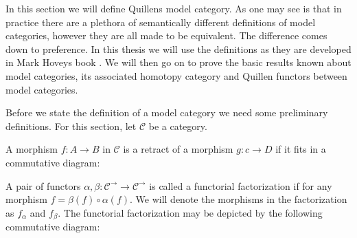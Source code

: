 \documentclass[../thesis.tex]{subfiles}
\begin{document}
        In this section we will define Quillens model category. As one may see is that in practice there are a plethora of semantically different definitions of model categories, however they are all made to be equivalent. The difference comes down to preference. In this thesis we will use the definitions as they are developed in Mark Hoveys book \cite{Hovey99}. We will then go on to prove the basic results known about model categories, its associated homotopy category and Quillen functors between model categories.

        Before we state the definition of a model category we need some preliminary definitions. For this section, let $\mathcal{C}$ be a category.

        \begin{definition}[Retract]
            A morphism $f:A\rightarrow B$ in $\mathcal{C}$ is a retract of a morphism $g: c\rightarrow D$ if it fits in a commutative diagram:
            \begin{center}
            \end{center}
        \end{definition}

        \begin{definition}
            A pair of functors $\alpha, \beta: \mathcal{C}^\rightarrow\rightarrow\mathcal{C}^\rightarrow$ is called a functorial factorization if for any morphism $f = \beta(f)\circ\alpha(f)$. We will denote the morphisms in the factorization as $f_\alpha$ and $f_\beta$. The functorial factorization may be depicted by the following commutative diagram:
            \begin{center}
            \end{center}
        \end{definition}
\end{document}
